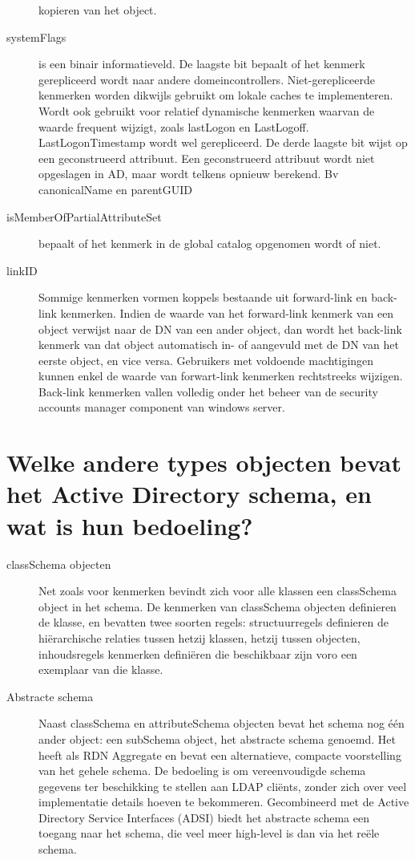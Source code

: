 \begin{description}
		kopieren van het object.
	\item[systemFlags] is een binair informatieveld. De laagste bit bepaalt
		of het kenmerk gerepliceerd wordt naar andere domeincontrollers.
		Niet-gerepliceerde kenmerken worden dikwijls gebruikt om lokale
		caches te implementeren. Wordt ook gebruikt voor relatief
		dynamische kenmerken waarvan de waarde frequent wijzigt, zoals
		lastLogon en LastLogoff. LastLogonTimestamp wordt wel
		gerepliceerd.
		De derde laagste bit wijst op een geconstrueerd attribuut. Een
		geconstrueerd attribuut wordt niet opgeslagen in AD, maar wordt
		telkens opnieuw berekend. Bv canonicalName en parentGUID
	\item[isMemberOfPartialAttributeSet] bepaalt of het kenmerk in de global
		catalog opgenomen wordt of niet.
	\item[linkID] Sommige kenmerken vormen koppels bestaande uit
		forward-link en back-link kenmerken. Indien de waarde van het
		forward-link kenmerk van een object verwijst naar de DN van een
		ander object, dan wordt het back-link kenmerk van dat object
		automatisch in- of aangevuld met de DN van het eerste object, en
		vice versa. Gebruikers met voldoende machtigingen kunnen enkel
		de waarde van forwart-link kenmerken rechtstreeks wijzigen.
		Back-link kenmerken vallen volledig onder het beheer van de
		security accounts manager component van windows server.
\end{description}

\section{Welke andere types objecten bevat het Active Directory schema, en wat
is hun bedoeling?}

\begin{description}
	\item[classSchema objecten] Net zoals voor kenmerken bevindt zich voor
		alle klassen een classSchema object in het schema. De kenmerken
		van classSchema objecten definieren de klasse, en bevatten twee
		soorten regels: structuurregels definieren de hiërarchische
		relaties tussen hetzij klassen, hetzij tussen objecten,
		inhoudsregels kenmerken definiëren die beschikbaar zijn voro een
		exemplaar van die klasse.
	\item[Abstracte schema] Naast classSchema en attributeSchema
		objecten bevat het schema nog één ander object: een subSchema
		object, het abstracte schema genoemd. Het heeft als RDN
		Aggregate en bevat een alternatieve, compacte voorstelling van
		het gehele schema. De bedoeling is om vereenvoudigde schema
		gegevens ter beschikking te stellen aan LDAP cliënts, zonder
		zich over veel implementatie details hoeven te bekommeren.
		Gecombineerd met de Active Directory Service Interfaces (ADSI)
		biedt het abstracte schema een toegang naar het schema, die veel
		meer high-level is dan via het reële schema.
\end{description}

